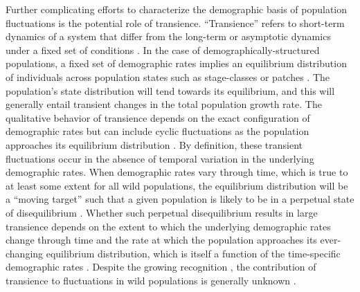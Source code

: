 \documentclass[11pt]{article}
\begin{document}
Further complicating efforts to characterize the demographic basis 
of population fluctuations is the potential role of transience.
``Transience'' refers to short-term dynamics of a system 
that differ from the long-term or asymptotic dynamics under a fixed set of conditions
\citep{hastings2010}.
In the case of demographically-structured populations,
a fixed set of demographic rates implies an equilibrium distribution
of individuals across population states such as stage-classes or patches
\citep{caswell2001matrix}.
The population's state distribution will tend towards its equilibrium,
and this will generally entail transient changes 
in the total population growth rate.
The qualitative behavior of transience depends
on the exact configuration of demographic rates
but can include cyclic fluctuations 
as the population approaches its equilibrium distribution
\citep{caswell2001matrix}.
By definition, these transient fluctuations occur in the absence 
of temporal variation in the underlying demographic rates.
When demographic rates vary through time,
which is true to at least some extent for all wild populations,
the equilibrium distribution will be a ``moving target''
such that a given population is likely to be in a perpetual state of disequilibrium
\citep{fox2000population, koons2017understanding}.
Whether such perpetual disequilibrium results in large transience 
depends on the extent to which the underlying demographic rates change through time
and the rate at which the population approaches its ever-changing equilibrium distribution,
which is itself a function of the time-specific demographic rates
\citep{caswell2005reactivity, caswell2007sensitivity}.
Despite the growing recognition
\citep{caswell2007sensitivity, koons2017understanding},
the contribution of transience to fluctuations in wild populations is generally unknown
\citep[but see][]{hoy2020fluctuations}.
\end{document}
